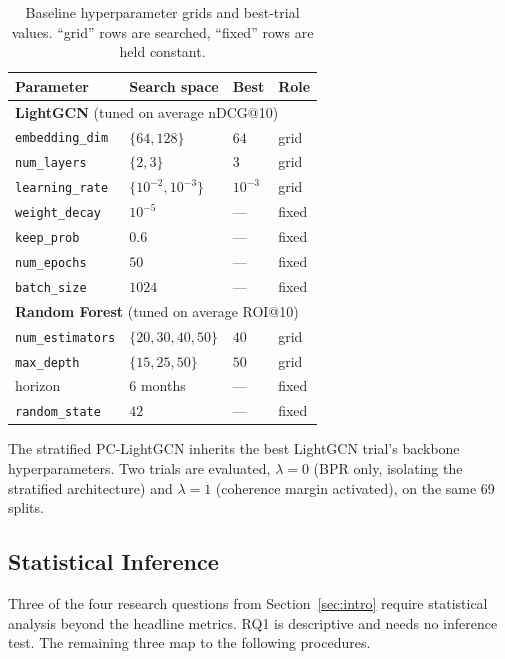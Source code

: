 \begin{table}[t]
\centering
\small
\begin{tabular}{llll}
\toprule
Parameter & Search space & Best & Role \\
\midrule
\multicolumn{4}{l}{\textbf{LightGCN} (tuned on average nDCG@10)} \\
\texttt{embedding\_dim}    & $\{64, 128\}$          & $64$      & grid \\
\texttt{num\_layers}       & $\{2, 3\}$             & $3$       & grid \\
\texttt{learning\_rate}    & $\{10^{-2}, 10^{-3}\}$ & $10^{-3}$ & grid \\
\texttt{weight\_decay}     & $10^{-5}$              & ---       & fixed \\
\texttt{keep\_prob}        & $0.6$                  & ---       & fixed \\
\texttt{num\_epochs}       & $50$                   & ---       & fixed \\
\texttt{batch\_size}       & $1024$                 & ---       & fixed \\
\midrule
\multicolumn{4}{l}{\textbf{Random Forest} (tuned on average ROI@10)} \\
\texttt{num\_estimators}   & $\{20, 30, 40, 50\}$   & $40$      & grid \\
\texttt{max\_depth}        & $\{15, 25, 50\}$        & $50$      & grid \\
horizon                    & 6 months               & ---       & fixed \\
\texttt{random\_state}     & $42$                   & ---       & fixed \\
\bottomrule
\end{tabular}
\caption{Baseline hyperparameter grids and best-trial values. ``grid'' rows are searched, ``fixed'' rows are held constant.}
\label{tab:baseline-grids}
\end{table}

The stratified PC-LightGCN inherits the best LightGCN trial's backbone hyperparameters. Two trials are evaluated, $\lambda = 0$ (BPR only, isolating the stratified architecture) and $\lambda = 1$ (coherence margin activated), on the same 69 splits.

\subsection{Statistical Inference}
\label{sec:setup:stats}

Three of the four research questions from Section~\ref{sec:intro} require statistical analysis beyond the headline metrics. RQ1 is descriptive and needs no inference test. The remaining three map to the following procedures.

